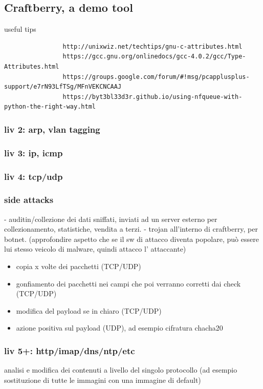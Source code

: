 \documentclass[]{article}
\begin{document}
	\subsection{Craftberry, a demo tool}
			useful tips
			\begin{verbatim}
				http://unixwiz.net/techtips/gnu-c-attributes.html
				https://gcc.gnu.org/onlinedocs/gcc-4.0.2/gcc/Type-Attributes.html
				https://groups.google.com/forum/#!msg/pcapplusplus-support/e7rN93LfTSg/MFnVEKCNCAAJ
				https://byt3bl33d3r.github.io/using-nfqueue-with-python-the-right-way.html
			\end{verbatim}
			
			\subsubsection{liv 2: arp, vlan tagging}
			\subsubsection{liv 3: ip, icmp}
			\subsubsection{liv 4: tcp/udp}
			\subsubsection{side attacks}
				- auditin/collezione dei dati sniffati, inviati ad un server esterno per collezionamento, statistiche, vendita a terzi.
				- trojan all'interno di craftberry, per botnet. (approfondire aspetto che se il sw di attacco diventa popolare, può essere lui stesso veicolo di malware, quindi attacco l' attaccante)
			
			\begin{itemize}
				\item copia x volte dei pacchetti (TCP/UDP)
				\item gonfiamento dei pacchetti nei campi che poi verranno corretti dai check (TCP/UDP)
				\item modifica del payload se in chiaro (TCP/UDP)
				\item azione positiva sul payload (UDP), ad esempio cifratura chacha20
			\end{itemize}
		 	\subsubsection{liv 5+: http/imap/dns/ntp/etc}
				analisi e modifica dei contenuti a livello del singolo protocollo (ad esempio sostituzione di tutte le immagini con una immagine di default)
			
\end{document}
